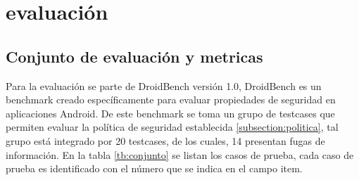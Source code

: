 \section{evaluación}
\subsection{Conjunto de evaluación y metricas}
Para la evaluación se parte de DroidBench versión
1.0\cite{DroidBenchBenchmarks}, DroidBench es un benchmark creado
específicamente para evaluar propiedades de seguridad en aplicaciones Android. 
De este benchmark se toma un grupo de testcases que permiten evaluar la política
de seguridad establecida \ref{subsection:politica}, tal grupo está integrado por
20 testcases, de los cuales, 14 presentan fugas de información. En la
tabla \ref{tb:conjunto} se listan los casos de prueba, cada caso de prueba es
identificado con el número que se indica en el campo item.

